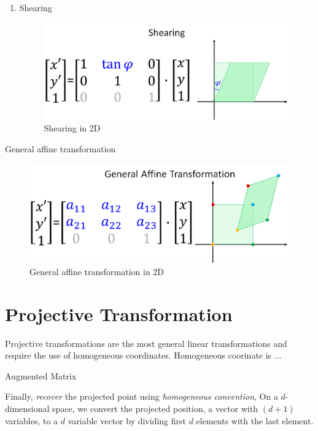 \begin{enumerate}
    \item Shearing 

\begin{figure}[H]
\centering
\includegraphics[width=\textwidth]{Shearing}
\caption{Shearing in 2D}\label{fig:Shearing}
\end{figure}

\end{enumerate} 


General affine transformation

\begin{figure}[H]
\centering
\includegraphics[width=\textwidth]{Affine}
\caption{General affine transformation in 2D}\label{fig:Affine}
\end{figure}





\section{Projective Transformation}

Projective transformations are the most general linear transformations and require the use of homogeneous coordinates.
Homogeneous coorinate is ...

Augmented Matrix

Finally, \textit{recover} the projected point using \textit{homogeneous convention}, 
On a $d$-dimensional space, we convert the projected position, a vector with $(d+1)$ variables, to a $d$ variable vector 
by dividing first $d$ elements with the last element.

